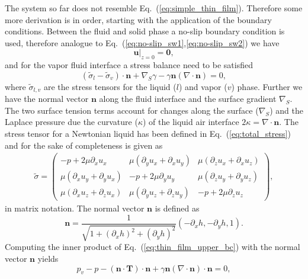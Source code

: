 The system so far does not resemble Eq.~(\ref{eq:simple_thin_film}).
Therefore some more derivation is in order, starting with the application of the boundary conditions.
Between the fluid and solid phase a no-slip boundary condition is used, therefore analogue to Eq.~(\ref{eq:no-slip_sw1},\ref{eq:no-slip_sw2}) we have
\begin{equation}\label{eq:thin_all_v_noslip}
    \mathbf{u}|_{z=0} = \mathbf{0},    
\end{equation}
and for the vapor fluid interface a stress balance need to be satisfied~\cite{leal2007advanced}
\begin{equation}\label{eq:thin_film_upper_bc}
    (\tilde{\sigma}_l - \tilde{\sigma}_v)\cdot\mathbf{n} + \nabla_S\gamma - \gamma\mathbf{n}(\nabla\cdot\mathbf{n}) = 0,
\end{equation}
where $\tilde{\sigma}_{l,v}$ are the stress tensors for the liquid ($l$) and vapor ($v$) phase. 
Further we have the normal vector $\mathbf{n}$ along the fluid interface and the surface gradient $\nabla_S$.
The two surface tension terms account for changes along the surface ($\nabla_S$) and the Laplace pressure due the curvature ($\kappa$) of the liquid air interface $2\kappa = \nabla\cdot\mathbf{n}$.
The stress tensor for a Newtonian liquid has been defined in Eq.~(\ref{eq:total_stress}) and for the sake of completeness is given as 
\begin{gather}\label{eq:stress_matrix}
    \tilde{\sigma} = \begin{pmatrix}
    -p + 2\mu\partial_x u_x & \mu(\partial_y u_x + \partial_x u_y) & \mu(\partial_z u_x + \partial_x u_z) \\
    \mu(\partial_x u_y + \partial_y u_x) & -p + 2\mu\partial_y u_y & \mu(\partial_z u_y + \partial_y u_z) \\
    \mu(\partial_x u_z + \partial_z u_x) & \mu(\partial_y u_z + \partial_z u_y) & -p + 2\mu\partial_z u_z   
    \end{pmatrix} ,
\end{gather}
in matrix notation.
The normal vector $\mathbf{n}$ is defined as 
\begin{equation}\label{eq:normal_vec_thin_film}
    \mathbf{n} = \frac{1}{\sqrt{1 + (\partial_x h)^2 + (\partial_y h)^2}}(-\partial_x h, -\partial_y h, 1).
\end{equation}
Computing the inner product of Eq.~(\ref{eq:thin_film_upper_bc}) with the normal vector $\mathbf{n}$ yields
\begin{equation}\label{eq:balance_stresses_normal}
    p_v - p -(\mathbf{n}\cdot\mathbf{T})\cdot\mathbf{n} + \gamma\mathbf{n}(\nabla\cdot\mathbf{n})\cdot\mathbf{n} = 0,
\end{equation}
